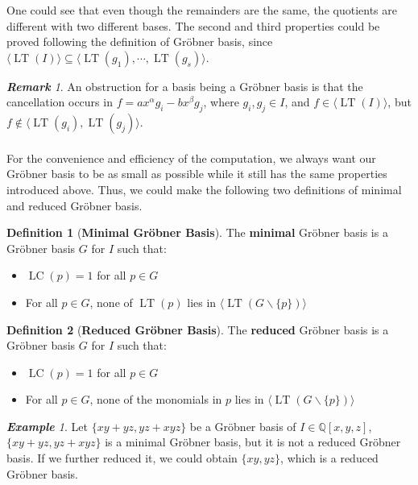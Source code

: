 \documentclass{article}
\newcommand{\lt}{\ensuremath{\operatorname{LT}}}
\newcommand{\lc}{\ensuremath{\operatorname{LC}}}
\theoremstyle{definition}
\newtheorem{definition}{Definition}[section]
\theoremstyle{remark}
\newtheorem*{remark}{\textbf{Remark}}
\theoremstyle{example}
\newtheorem{example}{\textbf{Example}}[section]
\begin{document}
One could see that even though the remainders are the same, the quotients are different with two different bases. The second and third properties could be proved following the definition of Gröbner basis, since $\langle \lt(I) \rangle \subseteq \langle \lt(g_1),\cdots, \lt(g_s) \rangle$.


\begin{remark}
    An obstruction for a basis being a Gröbner basis is that the cancellation occurs in $f = ax^{\alpha}g_i - bx^{\beta}g_{j}$, where $g_i,g_j \in I$, and $f \in \langle \lt(I) \rangle$, but $f \notin \langle \lt(g_i), \lt(g_j)\rangle$.
\end{remark}

\paragraph{}

For the convenience and efficiency of the computation, we always want our Gröbner basis to be as small as possible while it still has the same properties introduced above. Thus, we could make the following two definitions of minimal and reduced Gröbner basis.

\begin{definition}[\textbf{Minimal Gröbner Basis}]
    The \textbf{minimal} Gröbner basis is a Gröbner basis  $G$ for $I$ such that:
    \begin{itemize}
        \item $\lc(p) = 1$ for all $p \in G$
        \item For all $p \in G$, none of $\lt(p)$ lies in $\langle \lt(G\backslash\{p\}) \rangle$
    \end{itemize}
\end{definition}

\begin{definition}[\textbf{Reduced Gröbner Basis}]
    The \textbf{reduced} Gröbner basis is a Gröbner basis $G$ for $I$ such that:
    \begin{itemize}
        \item $\lc(p) = 1$ for all $p \in G$
        \item For all $p \in G$, none of the monomials in $p$ lies in $\langle \lt(G\backslash\{p\})\rangle$
    \end{itemize}
\end{definition}

\begin{example}
    Let $\{xy+yz,yz+xyz\}$ be a Gröbner basis of $I \in \mathbb{Q}[x,y,z]$, $\{xy+yz,yz+xyz\}$ is a minimal Gröbner basis, but it is not a reduced Gröbner basis. If we further reduced it, we could obtain $\{xy,yz\}$, which is a reduced Gröbner basis.
\end{example}
\end{document}
